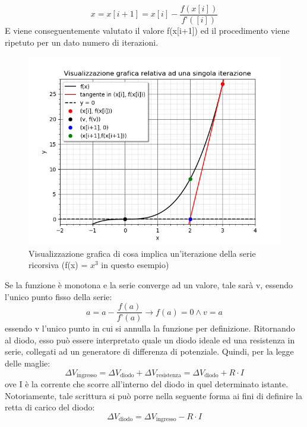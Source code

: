 \documentclass{article}[a4paper, oneside, 11pt]
\begin{document}
\begin{equation}\label{eq: invsck}
x = x[i+1] = x[i] - \frac{f(x[i])}{f’([i])}
\end{equation}
E viene conseguentemente valutato il valore f(x[i+1]) ed il procedimento viene ripetuto per un dato numero di iterazioni. 
\begin{figure}[H]
	\centering 
 		\includegraphics[scale=0.75]{./Figura1_appendiceB.png}
	\caption{Visualizzazione grafica di cosa implica un’iterazione della serie ricorsiva (f(x) = $x^3$ in questo esempio)}
\end{figure}
Se la funzione è monotona e la serie converge ad un valore, tale sarà v, essendo l’unico punto fisso della serie:
\begin{equation}\label{eq: invsck}
 {a = a -  {\frac{f(a)}{f{’}(a)}}}\to{{f(a) = 0}\land{v = a}}
\end{equation}
essendo v l’unico punto in cui si annulla la funzione per definizione.
Ritornando al diodo, esso può essere interpretato quale un diodo ideale ed una resistenza in serie, collegati ad un generatore di differenza di potenziale. Quindi, per la legge delle maglie:
\begin{equation}
\Delta V_{\text{ingresso}} = \Delta V_{\text{diodo}} + \Delta V_{\text{resistenza}} = \Delta V_{\text{diodo}} + R \cdot I
\end{equation}
ove I è la corrente che scorre all’interno del diodo in quel determinato istante. Notoriamente, tale scrittura si può porre nella seguente forma ai fini di definire la retta di carico del diodo:
\begin{equation}
\Delta V_{\text{diodo}} = \Delta V_{\text{ingresso}} - R \cdot I
\end{equation}
\end{document}
